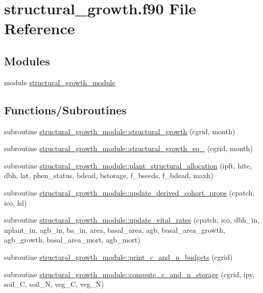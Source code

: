 \hypertarget{structural__growth_8f90}{}\section{structural\+\_\+growth.\+f90 File Reference}
\label{structural__growth_8f90}
\subsection*{Modules}
\begin{DoxyCompactItemize}
\item 
module \hyperlink{namespacestructural__growth__module}{structural\+\_\+growth\+\_\+module}
\end{DoxyCompactItemize}
\subsection*{Functions/\+Subroutines}
\begin{DoxyCompactItemize}
\item 
subroutine \hyperlink{namespacestructural__growth__module_aa974ce442fda8686fd4d88a42b0f150c}{structural\+\_\+growth\+\_\+module\+::structural\+\_\+growth} (cgrid, month)
\item 
subroutine \hyperlink{namespacestructural__growth__module_a931a1572c1755fe55035e52a1f902776}{structural\+\_\+growth\+\_\+module\+::structural\+\_\+growth\+\_\+eq\+\_} (cgrid, month)
\item 
subroutine \hyperlink{namespacestructural__growth__module_aed4ecdb3660ea4e11c1413deea3bd88a}{structural\+\_\+growth\+\_\+module\+::plant\+\_\+structural\+\_\+allocation} (ipft, hite, dbh, lat, phen\+\_\+status, bdead, bstorage, f\+\_\+bseeds, f\+\_\+bdead, maxh)
\item 
subroutine \hyperlink{namespacestructural__growth__module_a441f0f5e19550c214bed38602a81cc6e}{structural\+\_\+growth\+\_\+module\+::update\+\_\+derived\+\_\+cohort\+\_\+props} (cpatch, ico, lsl)
\item 
subroutine \hyperlink{namespacestructural__growth__module_a3151ee54c9ed9371b92d560206c56596}{structural\+\_\+growth\+\_\+module\+::update\+\_\+vital\+\_\+rates} (cpatch, ico, dbh\+\_\+in, nplant\+\_\+in, agb\+\_\+in, ba\+\_\+in, area, basal\+\_\+area, agb, basal\+\_\+area\+\_\+growth, agb\+\_\+growth, basal\+\_\+area\+\_\+mort, agb\+\_\+mort)
\item 
subroutine \hyperlink{namespacestructural__growth__module_a9c59bcfa47e35977865fd78a46ac1859}{structural\+\_\+growth\+\_\+module\+::print\+\_\+c\+\_\+and\+\_\+n\+\_\+budgets} (cgrid)
\item 
subroutine \hyperlink{namespacestructural__growth__module_a3da42ab408898e0fe6c82ca1a7c24766}{structural\+\_\+growth\+\_\+module\+::compute\+\_\+c\+\_\+and\+\_\+n\+\_\+storage} (cgrid, ipy, soil\+\_\+C, soil\+\_\+N, veg\+\_\+C, veg\+\_\+N)
\end{DoxyCompactItemize}
